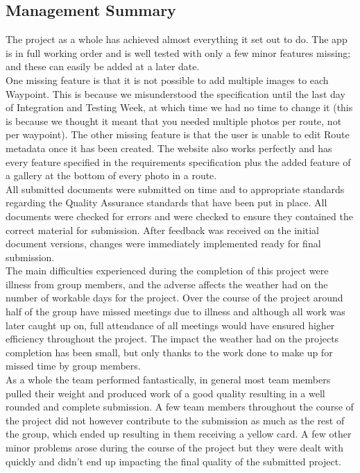 \documentclass{article}
\begin{document}
		\subsection{Management Summary}
		The project as a whole has achieved almost everything it set out to do. The app is in full working order and is well tested with only a few minor features missing; and these can easily be added at a later date. \\
		
		One missing feature is that it is not possible to add multiple images to each Waypoint. This is because we misunderstood the specification until the last day of Integration and Testing Week, at which time we had no time to change it (this is because we thought it meant that you needed multiple photos per route, not per waypoint). The other missing feature is that the user is unable to edit Route metadata once it has been created. The website also works perfectly and has every feature specified in the requirements specification plus the added feature of a gallery at the bottom of every photo in a route. \\

		All submitted documents were submitted on time and to appropriate standards regarding the Quality Assurance standards that have been put in place. All documents were checked for errors and were checked to ensure they contained the correct material for submission. After feedback was received on the initial document versions, changes were immediately implemented ready for final submission. \\

		The main difficulties experienced during the completion of this project were illness from group members, and the adverse affects the weather had on the number of workable days for the project. Over the course of the project around half of the group have missed meetings due to illness and although all work was later caught up on, full attendance of all meetings would have ensured higher efficiency throughout the project. The impact the weather had on the projects completion has been small, but only thanks to the work done to make up for missed time by group members. \\

		As a whole the team performed fantastically, in general most team members pulled their weight and produced work of a good quality resulting in a well rounded and complete submission. A few team members throughout the course of the project did not however contribute to the submission as much as the rest of the group, which ended up resulting in them receiving a yellow card. A few other minor problems arose during the course of the project but they were dealt with quickly and didn't end up impacting the final quality of the submitted project. \\
		
\end{document}
